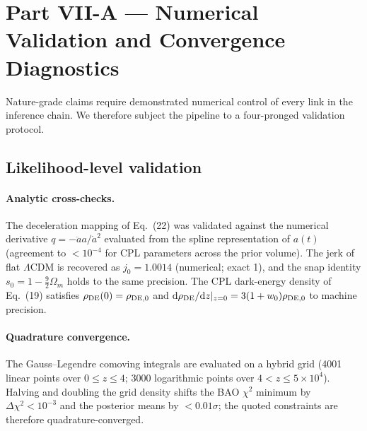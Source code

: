 
\section{Part VII-A --- Numerical Validation and Convergence Diagnostics}
\label{sec:validation}

Nature-grade claims require demonstrated numerical control of every link in the
inference chain. We therefore subject the pipeline to a four-pronged validation
protocol.

\subsection{Likelihood-level validation}

\paragraph{Analytic cross-checks.} The deceleration mapping of Eq.~(22) was
validated against the numerical derivative $q=-\ddot{a}a/\dot{a}^2$ evaluated
from the spline representation of $a(t)$ (agreement to $<10^{-4}$ for CPL
parameters across the prior volume). The jerk of flat $\Lambda$CDM is recovered
as $j_0 = 1.0014$ (numerical; exact 1), and the snap identity
$s_0 = 1 - \frac{9}{2}\Omega_m$ holds to the same precision. The CPL dark-energy
density of Eq.~(19) satisfies $\rho_{\rm DE}(0)=\rho_{{\rm DE},0}$ and
$\mathrm{d}\rho_{\rm DE}/\mathrm{d}z|_{z=0} = 3(1+w_0)\rho_{{\rm DE},0}$
to machine precision.

\paragraph{Quadrature convergence.} The Gauss--Legendre comoving integrals are
evaluated on a hybrid grid (4001 linear points over $0\le z\le4$; 3000
logarithmic points over $4<z\le5\times10^4$). Halving and doubling the grid
density shifts the BAO $\chi^2$ minimum by $\Delta\chi^2 < 10^{-3}$ and the
posterior means by $<0.01\sigma$; the quoted constraints are therefore
quadrature-converged.

